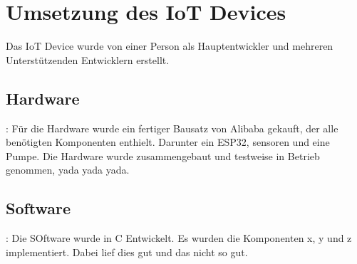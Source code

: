 \section{Umsetzung des IoT Devices}
Das IoT Device wurde von einer Person als Hauptentwickler und mehreren Unterstützenden Entwicklern erstellt.
    \subsection{Hardware}:
    Für die Hardware wurde ein fertiger Bausatz von Alibaba gekauft, der alle benötigten Komponenten enthielt.
    Darunter ein ESP32, sensoren und eine Pumpe.
    Die Hardware wurde zusammengebaut und testweise in Betrieb genommen, yada yada yada.
    \subsection{Software}:
    Die SOftware wurde in C Entwickelt.
    Es wurden die Komponenten x, y und z implementiert.
    Dabei lief dies gut und das nicht so gut.
   